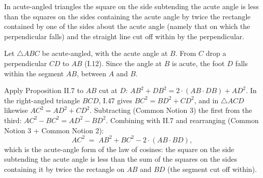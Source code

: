 \documentclass{rrxiv}
\begin{document}
\begin{claim}
\label{prop:II.13}
In acute-angled triangles the square on the side subtending the acute
angle is less than the squares on the sides containing the acute
angle by twice the rectangle contained by one of the sides about the
acute angle (namely that on which the perpendicular falls) and the
straight line cut off within by the perpendicular.
\end{claim}
\begin{evidence}[Proof of II.13]
\label{ev:II.13}
Let $\triangle ABC$ be acute-angled, with the acute angle at $B$.
From $C$ drop a perpendicular $CD$ to $AB$ (I.12).  Since the angle
at $B$ is acute, the foot $D$ falls within the segment $AB$, between
$A$ and $B$.

Apply Proposition II.7 to $AB$ cut at $D$: $AB^2 + DB^2 = 2\cdot
(AB \cdot DB) + AD^2$.  In the right-angled triangle $BCD$, I.47
gives $BC^2 = BD^2 + CD^2$, and in $\triangle ACD$ likewise
$AC^2 = AD^2 + CD^2$.  Subtracting (Common Notion 3) the first
from the third: $AC^2 - BC^2 = AD^2 - BD^2$.  Combining with II.7
and rearranging (Common Notion 3 + Common Notion 2):
\[
    AC^2 \;=\; AB^2 + BC^2 - 2\cdot(AB \cdot BD),
\]
which is the acute-angle form of the law of cosines: the square on
the side subtending the acute angle is less than the sum of the
squares on the sides containing it by twice the rectangle on $AB$
and $BD$ (the segment cut off within).
\end{evidence}
\end{document}
